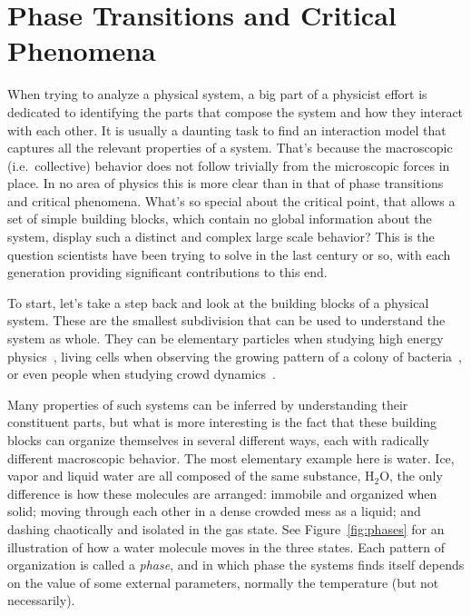 \chapter{Phase Transitions and Critical Phenomena}
\label{ch:crit}

When trying to analyze a physical system, a big part of a physicist effort is
dedicated to identifying the parts that compose the system and how they
interact with each other. It is usually a daunting task to find an interaction
model that captures all the relevant properties of a system. That's because the
macroscopic (i.e.\ collective) behavior does not follow trivially from the
microscopic forces in place. In no area of physics this is more clear than in
that of phase transitions and critical phenomena. What's so special about the
critical point, that allows a set of simple building blocks, which contain no
global information about the system, display such a distinct and complex large
scale behavior? This is the question scientists have been trying to solve in
the last century or so, with each generation providing significant
contributions to this end.


To start, let's take a step back and look at the building blocks of a physical
system. These are the smallest subdivision that can be used to understand the
system as whole. They can be elementary particles when studying high energy
physics~\cite{Boyanovsky2006}, living cells when observing the growing pattern
of a colony of bacteria~\cite{Matsushita1990}, or even people when studying
crowd dynamics~\cite{Minoru1999}.

Many properties of such systems can be inferred by understanding their
constituent parts, but what is more interesting is the fact that these building
blocks can organize themselves in several different ways, each with radically
different macroscopic behavior. The most elementary example here is water. Ice,
vapor and liquid water are all composed of the same substance, H${}_2$O, the
only difference is how these molecules are arranged: immobile and organized
when solid; moving through each other in a dense crowded mess as a liquid; and
dashing chaotically and isolated in the gas state. See Figure~\ref{fig:phases}
for an illustration of how a water molecule moves in the three states. Each
pattern of organization is called a \textit{phase}, and in which phase the
systems finds itself depends on the value of some external parameters, normally
the temperature (but not necessarily).

